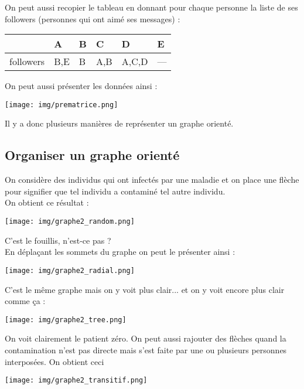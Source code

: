 \documentclass[a4paper,12pt]{book}
\begin{document}
On peut aussi recopier le tableau en donnant pour chaque personne la liste de ses \og followers\fg{} (personnes qui ont aimé ses messages) :

\begin{center}
\begin{tabular}{|l|>{\centering\arraybackslash}p{1cm}|>{\centering\arraybackslash}p{1cm}|>{\centering\arraybackslash}p{1cm}|>{\centering\arraybackslash}p{1cm}|>{\centering\arraybackslash}p{1cm}|}
\hline
 & A & B & C & D & E \\
\hline
followers  & B,E & B & A,B & A,C,D & --- \\
\hline
\end{tabular}
\end{center}

On peut aussi présenter les données ainsi :

\begin{center}
\texttt{[image: img/prematrice.png]}
\end{center}
Il y a donc plusieurs manières de représenter un graphe orienté.

\subsection*{Organiser un graphe orienté}

On considère des individus qui ont infectés par une maladie et on place une flèche pour signifier que tel individu a contaminé tel autre individu.\\
On obtient ce résultat :
\begin{center}
\texttt{[image: img/graphe2\_random.png]}
\end{center}
C'est le fouillis, n'est-ce pas ? \\
En déplaçant les sommets du graphe on peut le présenter ainsi :
\begin{center}
\texttt{[image: img/graphe2\_radial.png]}
\end{center}
C'est le même graphe mais on y voit plus clair... et on y voit encore plus clair comme ça :
\begin{center}
\texttt{[image: img/graphe2\_tree.png]}
\end{center}
On voit clairement le \og patient zéro\fg{}. On peut aussi rajouter des flèches quand la contamination n'est pas directe mais s'est faite \og par une ou plusieurs personnes interposées\fg{}. On obtient ceci
\begin{center}
\texttt{[image: img/graphe2\_transitif.png]}
\end{center}
\end{document}
